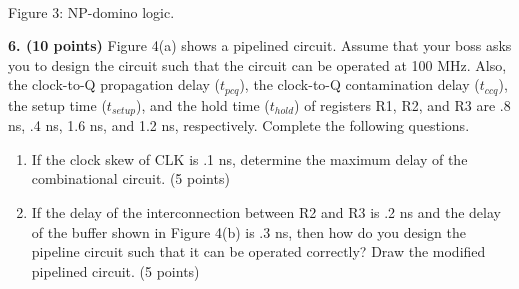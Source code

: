 \documentclass[10pt]{article}
\newcommand{\mos}[4]{\begin{scope}[shift={(#1,#2)}]
\draw (0,.24)--(0,-.24);\draw (0,.20)--(.25,.20)--(.25,.5);
\draw (0,-.20)--(.25,-.20)--(.25,-.5);\draw (-.16,.23)--(-.16,-.23);
\ifnum#4=1\draw (-.26,0) circle (.06);\draw (-.75,0)--(-.32,0);\else\draw (-.75,0)--(-.16,0);\fi
\node[anchor=east,font=\scriptsize] at (-.76,0) {$#3$};\end{scope}}
\newcommand{\ground}[2]{\draw (#1,#2)--(#1,{#2-.12});\draw ({#1-.17},{#2-.12})--({#1+.17},{#2-.12});\draw ({#1-.11},{#2-.20})--({#1+.11},{#2-.20});}
\newcommand{\rail}[3]{\draw (#1,#2)--(#1,{#2+.14});\node[above,font=\scriptsize] at (#1,{#2+.14}) {$#3$};}
\begin{document}
\begin{center}\\Figure 3: NP-domino logic.\end{center}
\newpage
\textbf{6. (10 points)} Figure 4(a) shows a pipelined circuit. Assume that your boss asks you to design the circuit such that the circuit can be operated at 100 MHz. Also, the clock-to-Q propagation delay ($t_{pcq}$), the clock-to-Q contamination delay ($t_{ccq}$), the setup time ($t_{setup}$), and the hold time ($t_{hold}$) of registers R1, R2, and R3 are .8 ns, .4 ns, 1.6 ns, and 1.2 ns, respectively. Complete the following questions.
\begin{enumerate}[label=(\alph*),leftmargin=7mm]
\item If the clock skew of CLK is .1 ns, determine the maximum delay of the combinational circuit. (5 points)
\item If the delay of the interconnection between R2 and R3 is .2 ns and the delay of the buffer shown in Figure 4(b) is .3 ns, then how do you design the pipeline circuit such that it can be operated correctly? Draw the modified pipelined circuit. (5 points)
\end{enumerate}
\end{document}
